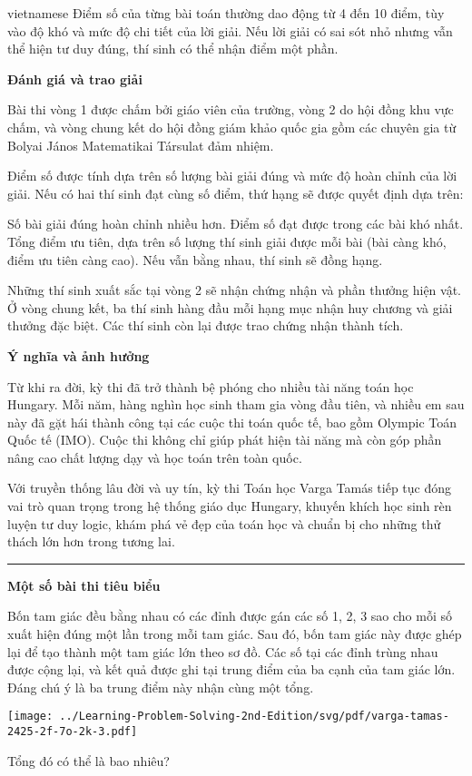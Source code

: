 \documentclass{article}
\begin{document}
\begin{otherlanguage*}{vietnamese}
Điểm số của từng bài toán thường dao động từ 4 đến 10 điểm, tùy vào độ khó và mức độ chi tiết của lời giải. Nếu lời giải có sai sót nhỏ nhưng vẫn thể hiện tư duy đúng, thí sinh có thể nhận điểm một phần.

\textbf{Đánh giá và trao giải}

Bài thi vòng 1 được chấm bởi giáo viên của trường, vòng 2 do hội đồng khu vực chấm, và vòng chung kết do hội đồng giám khảo quốc gia gồm các chuyên gia từ Bolyai János Matematikai Társulat đảm nhiệm.

Điểm số được tính dựa trên số lượng bài giải đúng và mức độ hoàn chỉnh của lời giải. Nếu có hai thí sinh đạt cùng số điểm, thứ hạng sẽ được quyết định dựa trên:
\begin{enumerate}[topsep=0pt, partopsep=0pt, itemsep=0pt]
    \ii Số bài giải đúng hoàn chỉnh nhiều hơn.
    \ii Điểm số đạt được trong các bài khó nhất.
    \ii Tổng điểm ưu tiên, dựa trên số lượng thí sinh giải được mỗi bài (bài càng khó, điểm ưu tiên càng cao).
    Nếu vẫn bằng nhau, thí sinh sẽ đồng hạng.
\end{enumerate}

Những thí sinh xuất sắc tại vòng 2 sẽ nhận chứng nhận và phần thưởng hiện vật. Ở vòng chung kết, ba thí sinh hàng đầu mỗi hạng mục nhận huy chương và giải thưởng đặc biệt.
Các thí sinh còn lại được trao chứng nhận thành tích.

\textbf{Ý nghĩa và ảnh hưởng}

Từ khi ra đời, kỳ thi đã trở thành bệ phóng cho nhiều tài năng toán học Hungary. Mỗi năm, hàng nghìn học sinh tham gia vòng đầu tiên,
và nhiều em sau này đã gặt hái thành công tại các cuộc thi toán quốc tế, bao gồm Olympic Toán Quốc tế (IMO).
Cuộc thi không chỉ giúp phát hiện tài năng mà còn góp phần nâng cao chất lượng dạy và học toán trên toàn quốc.

Với truyền thống lâu đời và uy tín, kỳ thi Toán học Varga Tamás tiếp tục đóng vai trò quan trọng trong hệ thống giáo dục Hungary,
khuyến khích học sinh rèn luyện tư duy logic, khám phá vẻ đẹp của toán học và chuẩn bị cho những thử thách lớn hơn trong tương lai.

\bigbreak

\noindent\rule{16.5cm}{0.4pt}

\textbf{Một số bài thi tiêu biểu}

\bigbreak

\begin{problem*}
    Bốn tam giác đều bằng nhau có các đỉnh được gán các số 1, 2, 3 sao cho mỗi số xuất hiện đúng một lần trong mỗi tam giác.
    Sau đó, bốn tam giác này được ghép lại để tạo thành một tam giác lớn theo sơ đồ.
    Các số tại các đỉnh trùng nhau được cộng lại, và kết quả được ghi tại trung điểm của ba cạnh của tam giác lớn. Đáng chú ý là ba trung điểm này nhận cùng một tổng.
    \begin{center}
        \texttt{[image: ../Learning-Problem-Solving-2nd-Edition/svg/pdf/varga-tamas-2425-2f-7o-2k-3.pdf]}
    \end{center}
    Tổng đó có thể là bao nhiêu?
\end{problem*}


\end{otherlanguage*}
\end{document}
